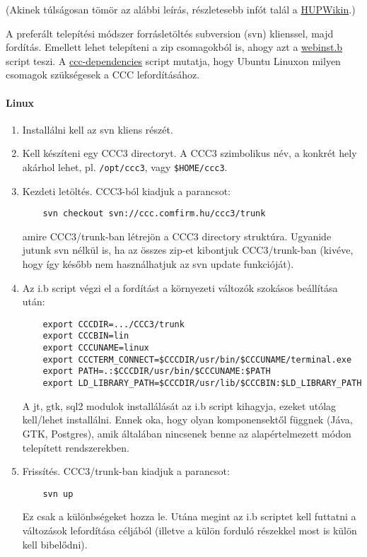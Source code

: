 
(Akinek túlságosan tömör az alábbi leírás,  részletesebb 
infót talál a \href{http://wiki.hup.hu/index.php/CCC}{HUPWikin}.)

A preferált telepítési módszer forrásletöltés subversion (svn) klienssel,
majd fordítás. Emellett lehet telepíteni a zip csomagokból is, ahogy
azt a \href{webinst.b}{webinst.b} script teszi. 
A \href{ccc-dependencies}{ccc-dependencies} script mutatja,
hogy Ubuntu Linuxon milyen csomagok szükségesek a CCC lefordításához.

\paragraph{Linux}

\begin{enumerate}
\item Installálni kell az svn kliens részét.

\item Kell készíteni egy CCC3 directoryt.
    A CCC3  szimbolikus név, a konkrét hely akárhol lehet,
    pl. \verb!/opt/ccc3!, vagy \verb!$HOME/ccc3!.

\item Kezdeti letöltés. CCC3-ból kiadjuk a parancsot:
\begin{verbatim}
    svn checkout svn://ccc.comfirm.hu/ccc3/trunk
\end{verbatim}
  amire CCC3/trunk-ban létrejön a CCC3 directory struktúra.
  Ugyanide jutunk svn nélkül is, ha az összes
  zip-et kibontjuk  CCC3/trunk-ban (kivéve,
  hogy így később nem használhatjuk az svn update funkcióját).

\item Az i.b script végzi el a fordítást 
  a környezeti változók szokásos beállítása után:
\begin{verbatim}
    export CCCDIR=.../CCC3/trunk
    export CCCBIN=lin
    export CCCUNAME=linux
    export CCCTERM_CONNECT=$CCCDIR/usr/bin/$CCCUNAME/terminal.exe
    export PATH=.:$CCCDIR/usr/bin/$CCCUNAME:$PATH
    export LD_LIBRARY_PATH=$CCCDIR/usr/lib/$CCCBIN:$LD_LIBRARY_PATH
\end{verbatim}
  A jt, gtk, sql2 modulok installálását az i.b script kihagyja,
  ezeket utólag kell/lehet installálni.
  Ennek oka, hogy olyan komponensektől függnek
  (Jáva, GTK, Postgres), amik általában 
  nincsenek benne az alapértelmezett módon telepített rendszerekben.

  
\item Frissítés. CCC3/trunk-ban kiadjuk a parancsot:
\begin{verbatim}
    svn up
\end{verbatim}
  Ez csak a különbségeket hozza le. Utána megint
  az i.b scriptet kell futtatni a változások lefordítása céljából
  (illetve a külön forduló részekkel most is külön kell bibelődni).
\end{enumerate}

